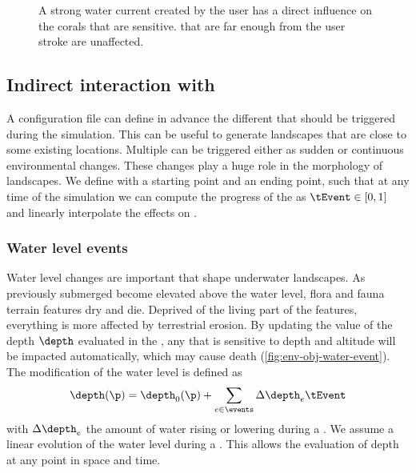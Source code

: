 \begin{figure}
    \caption{A strong water current created by the user has a direct influence on the corals that are sensitive.  that are far enough from the user stroke are unaffected.}
    \label{fig:env-obj-user-flow-effects}
\end{figure}

\subsection{Indirect interaction with }
\label{sec:env-obj-events}
A configuration file can define in advance the different  that should be triggered during the simulation. This can be useful to generate landscapes that are close to some existing locations.
Multiple  can be triggered either as sudden or continuous environmental changes. These changes play a huge role in the morphology of landscapes.
We define  with a starting point and an ending point, such that at any time of the simulation we can compute the progress of the  as $\tEvent \in [0, 1]$ and linearly interpolate the effects on .

\subsubsection{Water level events}
Water level changes are important  that shape underwater landscapes. As previously submerged  become elevated above the water level, flora and fauna terrain features dry and die. Deprived of the living part of the features, everything is more affected by terrestrial erosion. By updating the value of the depth $\depth$ evaluated in the , any  that is sensitive to depth and altitude will be impacted automatically, which may cause death (\cref{fig:env-obj-water-event}). The modification of the water level is defined as
\begin{align}
    \depth(\p) = \depth_0(\p) + \sum_{e \in \events} \Delta \depth_e \tEvent
\end{align}
with $\Delta \depth_e$ the amount of water rising or lowering during a . We assume a linear evolution of the water level during a . This allows the evaluation of depth at any point in space and time.

